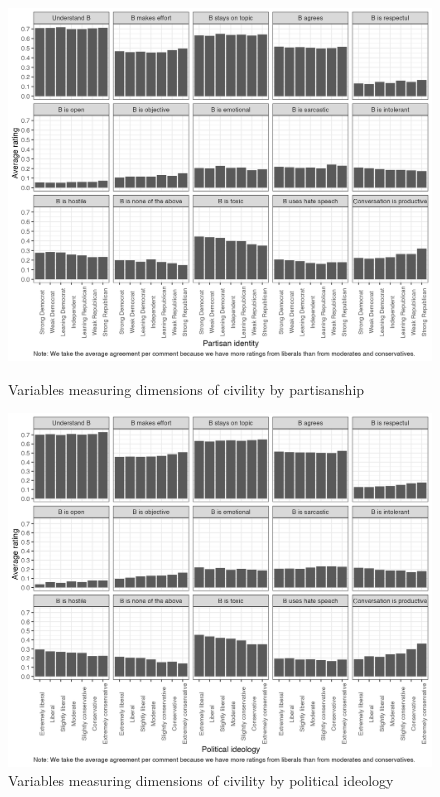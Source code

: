 \documentclass{article}
\begin{document}
\clearpage

\begin{figure}
    \centering
    \includegraphics[width=1\linewidth]{figures/2_AvgPercAgreeing_Partisanship.png}
    \caption{Variables measuring dimensions of civility by partisanship}
    \label{fig:civility-partisanship}
    \vspace{0.25cm}
    \includegraphics[width=1\linewidth]{figures/2_AvgPercAgreeing_Ideo.png}
    \caption{Variables measuring dimensions of civility by political ideology}
    \label{fig:civility-ideology}
\end{figure}
\end{document}
